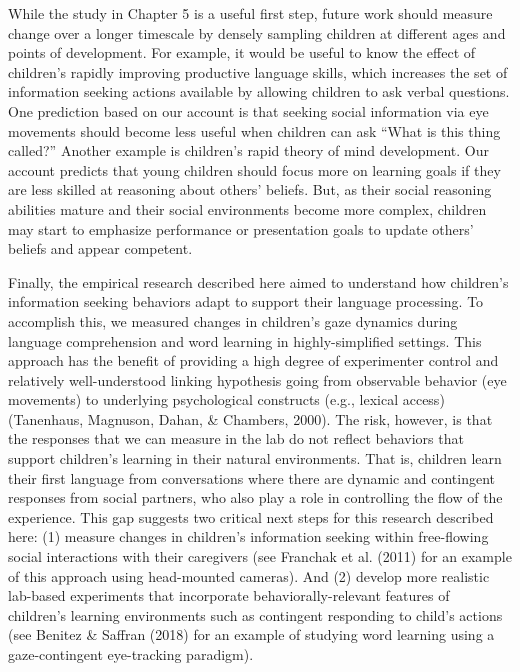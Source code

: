 \documentclass[oneside]{report}
\begin{document}
While the study in Chapter 5 is a useful first step, future work should
measure change over a longer timescale by densely sampling children at
different ages and points of development. For example, it would be
useful to know the effect of children's rapidly improving productive
language skills, which increases the set of information seeking actions
available by allowing children to ask verbal questions. One prediction
based on our account is that seeking social information via eye
movements should become less useful when children can ask ``What is this
thing called?'' Another example is children's rapid theory of mind
development. Our account predicts that young children should focus more
on learning goals if they are less skilled at reasoning about others'
beliefs. But, as their social reasoning abilities mature and their
social environments become more complex, children may start to emphasize
performance or presentation goals to update others' beliefs and appear
competent.

Finally, the empirical research described here aimed to understand how
children's information seeking behaviors adapt to support their language
processing. To accomplish this, we measured changes in children's gaze
dynamics during language comprehension and word learning in
highly-simplified settings. This approach has the benefit of providing a
high degree of experimenter control and relatively well-understood
linking hypothesis going from observable behavior (eye movements) to
underlying psychological constructs (e.g., lexical access) (Tanenhaus,
Magnuson, Dahan, \& Chambers, 2000). The risk, however, is that the
responses that we can measure in the lab do not reflect behaviors that
support children's learning in their natural environments. That is,
children learn their first language from conversations where there are
dynamic and contingent responses from social partners, who also play a
role in controlling the flow of the experience. This gap suggests two
critical next steps for this research described here: (1) measure
changes in children's information seeking within free-flowing social
interactions with their caregivers (see Franchak et al. (2011) for an
example of this approach using head-mounted cameras). And (2) develop
more realistic lab-based experiments that incorporate
behaviorally-relevant features of children's learning environments such
as contingent responding to child's actions (see Benitez \& Saffran
(2018) for an example of studying word learning using a gaze-contingent
eye-tracking paradigm).
\end{document}
